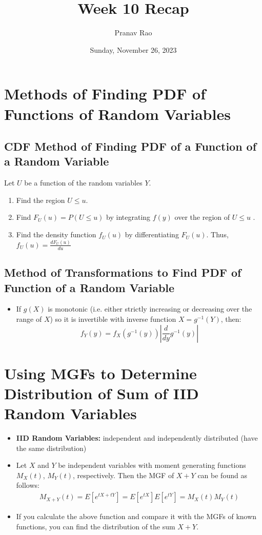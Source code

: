 \documentclass[12pt]{article}
\title{Week 10 Recap}
\author{Pranav Rao}
\date{Sunday, November 26, 2023}
\begin{document}
\maketitle

\section{Methods of Finding PDF of Functions of Random Variables}

\subsection{CDF Method of Finding PDF of a Function of a Random Variable}

Let $U$ be a function of the random variables $Y$.
\begin{enumerate}
	\item Find the region $U \leq u$.
	\item Find $F_U(u) = P(U \leq u)$ by integrating $f(y)$ over the region of $U \leq u$ .
	\item Find the density function $f_U(u)$ by differentiating $F_U(u)$. Thus,
	      $f_U(u) = \frac{dF_U(u)}{du}$
\end{enumerate}

\subsection{Method of Transformations to Find PDF of Function of a Random Variable}

\begin{itemize}
	\item If $g(X)$ is monotonic (i.e. either strictly increasing or decreasing over the range of $X$) so it is invertible with inverse function $X = g^{-1}(Y)$, then:
	      \[
		      f_Y(y) = f_X(g^{-1}(y)) \left|\frac{d}{dy} g^{-1}(y)\right|
	      \]
\end{itemize}

\section{Using MGFs to Determine Distribution of Sum of IID Random Variables}
\begin{itemize}
	\item \textbf{IID Random Variables:} independent and independently
	      distributed (have the same distribution)
	\item Let $X$ and $Y$ be independent variables with moment generating
	      functions $M_X(t)$, $M_Y(t)$, respectively. Then the MGF of $X + Y$
	      can be found as follows:
	      \begin{align*}
		      M_{X + Y}(t) = E[e^{tX+tY}] = E[e^{tX}]E[e^{tY}] = M_X(t)M_Y(t)
	      \end{align*}
	\item If you calculate the above function and compare it with the
	      MGFs of known functions, you can find the distribution of the sum
	      $X + Y$.
\end{itemize}
\end{document}
